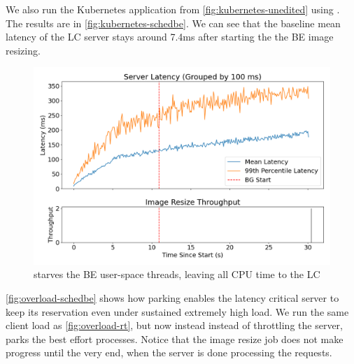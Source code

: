 We also run the Kubernetes application from \autoref{fig:kubernetes-unedited}
using \beclass{}. The results are in \autoref{fig:kubernetes-schedbe}. We can
see that the baseline mean latency of the LC server stays around 7.4ms after
starting the the BE image resizing.

\begin{figure}[t]
    \centering
    \includegraphics[width=\columnwidth]{graphs/overload-schedbe.png}
    \caption{ \beclass{} starves the BE user-space threads, leaving all CPU time
    to the LC}\label{fig:overload-schedbe}
\end{figure}

\autoref{fig:overload-schedbe} shows how parking enables the latency critical
server to keep its reservation even under sustained extremely high load. We run
the same client load as \autoref{fig:overload-rt}, but now instead instead of
throttling the server, \beclass{} parks the best effort processes. Notice that
the \beclass{} image resize job does not make progress until the very end, when
the server is done processing the requests.

